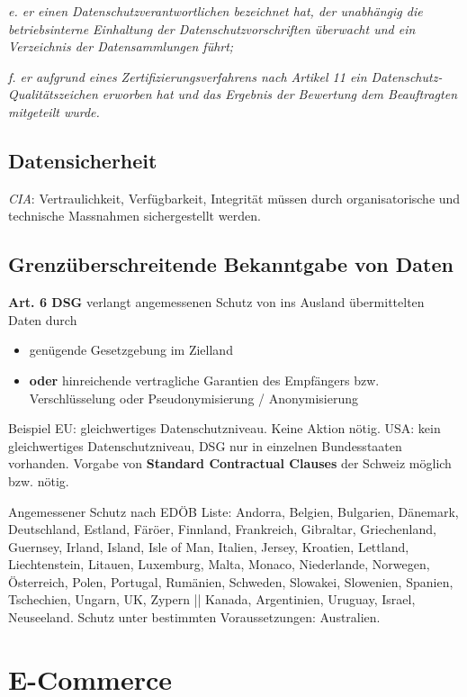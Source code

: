 \textit{e. er einen Datenschutzverantwortlichen bezeichnet hat, der unabhängig die betriebsinterne Einhaltung der Datenschutzvorschriften überwacht und ein Verzeichnis der Datensammlungen führt;}

\textit{f. er aufgrund eines Zertifizierungsverfahrens nach Artikel 11 ein Datenschutz-Qualitätszeichen erworben hat und das Ergebnis der Bewertung dem Beauftragten mitgeteilt wurde.}

\subsection{Datensicherheit}
\textit{CIA}: Vertraulichkeit, Verfügbarkeit, Integrität müssen durch organisatorische und technische Massnahmen sichergestellt werden.

\subsection{Grenzüberschreitende Bekanntgabe von Daten}
\textbf{Art. 6 DSG} verlangt angemessenen Schutz von ins Ausland übermittelten Daten durch
\begin{itemize}
  \item genügende Gesetzgebung im Zielland
  \item \textbf{oder} hinreichende vertragliche Garantien des Empfängers bzw. Verschlüsselung oder Pseudonymisierung / Anonymisierung
\end{itemize}

Beispiel EU: gleichwertiges Datenschutzniveau. Keine Aktion nötig. USA: kein gleichwertiges Datenschutzniveau, DSG nur in einzelnen Bundesstaaten vorhanden. Vorgabe von \textbf{Standard Contractual Clauses} der Schweiz möglich bzw. nötig.

Angemessener Schutz nach EDÖB Liste:
Andorra, Belgien, Bulgarien, Dänemark, Deutschland, Estland, Färöer, Finnland, Frankreich, Gibraltar, Griechenland, Guernsey, Irland, Island, Isle of Man, Italien, Jersey, Kroatien, Lettland, Liechtenstein, Litauen, Luxemburg, Malta, Monaco, Niederlande, Norwegen, Österreich, Polen, Portugal, Rumänien, Schweden, Slowakei, Slowenien, Spanien, Tschechien, Ungarn, UK, Zypern || Kanada, Argentinien, Uruguay, Israel, Neuseeland. Schutz unter bestimmten Voraussetzungen: Australien.

\section{E-Commerce}

